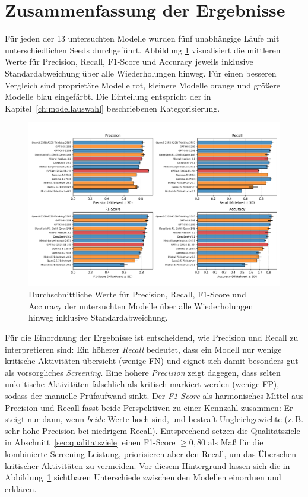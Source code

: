 \section{Zusammenfassung der Ergebnisse}\label{sec:ueberblick}

Für jeden der 13 untersuchten Modelle wurden fünf unabhängige Läufe mit unterschiedlichen Seeds durchgeführt. Abbildung \ref{fig:results-evaluation-metrics-comparison} visualisiert die mittleren Werte für Precision, Recall, F1-Score und Accuracy jeweils inklusive Standardabweichung über alle Wiederholungen hinweg. Für einen besseren Vergleich sind proprietäre Modelle rot, kleinere Modelle orange und größere Modelle blau eingefärbt. Die Einteilung entspricht der in Kapitel~\ref{ch:modellauswahl} beschriebenen Kategorisierung.

\begin{figure}[h]
    \centering
    \includegraphics[width=\textwidth]{images/results/evaluation_metrics_comparison}
    \caption{Durchschnittliche Werte für Precision, Recall, F1-Score und Accuracy der untersuchten Modelle über alle Wiederholungen hinweg inklusive Standardabweichung.}
    \label{fig:results-evaluation-metrics-comparison}
\end{figure}

Für die Einordnung der Ergebnisse ist entscheidend, wie Precision und Recall zu interpretieren sind: Ein höherer \emph{Recall} bedeutet, dass ein Modell nur wenige kritische Aktivitäten übersieht (wenige \ac{FN}) und eignet sich damit besonders gut als vorsorgliches \emph{Screening}. Eine höhere \emph{Precision} zeigt dagegen, dass selten unkritische Aktivitäten fälschlich als kritisch markiert werden (wenige \ac{FP}), sodass der manuelle Prüfaufwand sinkt. Der \emph{F1-Score} als harmonisches Mittel aus Precision und Recall fasst beide Perspektiven zu einer Kennzahl zusammen: Er steigt nur dann, wenn \emph{beide} Werte hoch sind, und bestraft Ungleichgewichte (z.\,B. sehr hohe Precision bei niedrigem Recall). Entsprechend setzen die Qualitätsziele in Abschnitt~\ref{sec:qualitatsziele} einen F1-Score $\geq 0{,}80$ als Maß für die kombinierte Screening-Leistung, priorisieren aber den Recall, um das Übersehen kritischer Aktivitäten zu vermeiden. Vor diesem Hintergrund lassen sich die in Abbildung~\ref{fig:results-evaluation-metrics-comparison} sichtbaren Unterschiede zwischen den Modellen einordnen und erklären.

